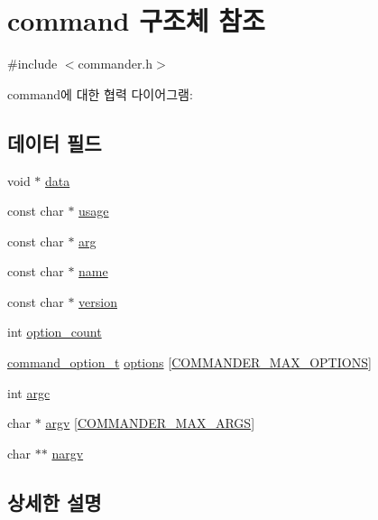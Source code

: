 \hypertarget{structcommand}{}\section{command 구조체 참조}
\label{structcommand}


{\ttfamily \#include $<$commander.\+h$>$}



command에 대한 협력 다이어그램\+:
\subsection*{데이터 필드}
\begin{DoxyCompactItemize}
\item 
void $\ast$ \mbox{\hyperlink{structcommand_a735984d41155bc1032e09bece8f8d66d}{data}}
\item 
const char $\ast$ \mbox{\hyperlink{structcommand_aef1bd6ad890a110b466cb0e8088507a2}{usage}}
\item 
const char $\ast$ \mbox{\hyperlink{structcommand_ac3a73711fd7f8a50db1c4b62e41cf852}{arg}}
\item 
const char $\ast$ \mbox{\hyperlink{structcommand_a8f8f80d37794cde9472343e4487ba3eb}{name}}
\item 
const char $\ast$ \mbox{\hyperlink{structcommand_aa31f487a99743d24af9076a3e11e5425}{version}}
\item 
int \mbox{\hyperlink{structcommand_aa1c4da4dcba08b1cacc8872e16c064d3}{option\+\_\+count}}
\item 
\mbox{\hyperlink{structcommand__option__t}{command\+\_\+option\+\_\+t}} \mbox{\hyperlink{structcommand_a6873c7f9bafefe7bae8d4442016ecc6e}{options}} \mbox{[}\mbox{\hyperlink{commander_8h_aa331c32db06b1bdd12d08678dcd72b08}{C\+O\+M\+M\+A\+N\+D\+E\+R\+\_\+\+M\+A\+X\+\_\+\+O\+P\+T\+I\+O\+NS}}\mbox{]}
\item 
int \mbox{\hyperlink{structcommand_ad1447518f4372828b8435ae82e48499e}{argc}}
\item 
char $\ast$ \mbox{\hyperlink{structcommand_aed8f6e06a56bb85b754b64e4136774bd}{argv}} \mbox{[}\mbox{\hyperlink{commander_8h_a6028ef8b1953bf82a53a8aa54c4bf075}{C\+O\+M\+M\+A\+N\+D\+E\+R\+\_\+\+M\+A\+X\+\_\+\+A\+R\+GS}}\mbox{]}
\item 
char $\ast$$\ast$ \mbox{\hyperlink{structcommand_a3397675d6ecb269951a11a8654e503e5}{nargv}}
\end{DoxyCompactItemize}


\subsection{상세한 설명}


